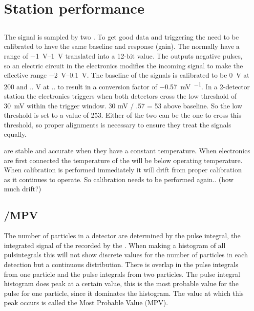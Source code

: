 \section{Station performance}


\subsection{\adcs}

The signal is sampled by two \adcs. To get good data and
triggering the \adcs need to be calibrated to have the same baseline and
response (gain). The \adcs normally have a range of
\SIrange{-1}{1}{\volt} translated into a 12-bit value. The \pmt outputs
negative pulses, so an electric circuit in the \hisparc electronics
modifies the incoming signal to make the effective \adc range
\SIrange{-2}{0.1}{\volt}. The baseline of the signals is calibrated to
be \SI{0}{\volt} at \SI{200}{\adc} and .. V at .. \Adcs to result in a
conversion factor of \SI{-0.57}{\milli\volt\per\adc}. In a 2-detector
station the \hisparc electronics triggers when both detectors cross the
low threshold of \SI{30}{\milli\volt} within the trigger window. 30 mV /
.57 = 53 above baseline. So the low threshold is set to a value of
\SI{253}{\adc}. Either of the two \adcs can be the one to cross this
threshold, so proper \adc alignments is necessary to ensure they treat
the signals equally.

\adcs are stable and accurate when they have a constant temperature.
When \hisparc electronics are first connected the temperature of the
\adcs will be below operating temperature. When calibration is performed
immediately it will drift from proper calibration as it continues to
operate. So calibration needs to be performed again.. (how much drift?)


\subsection{\mip/MPV}

The number of particles in a detector are determined by the pulse
integral, the integrated signal of the \pmt recorded by the \adc. When
making a histogram of all pulsintegrals this will not show discrete
values for the number of particles in each detection but a continuous
distribution. There is overlap in the pulse integrals from one particle
and the pulse integrals from two particles. The pulse integral histogram
does peak at a certain value, this is the most probable value for the
pulse for one particle, since it dominates the histogram. The value at
which this peak occurs is called the Most Probable Value (MPV).

